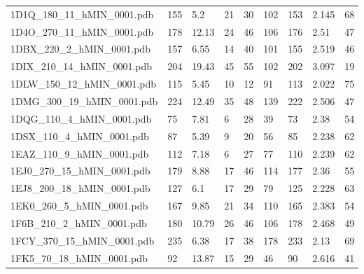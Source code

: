 \documentclass{bioinfo}
\begin{document}
\begin{table}[!t]
{\begin{tabular}{lllllllll}
    1D1Q\_180\_11\_hMIN\_0001.pdb & 155      & 5.2        & 21          & 30          & 102         & 153     & 2.145           & 68           \\
    1D4O\_270\_11\_hMIN\_0001.pdb & 178      & 12.13      & 24          & 46          & 106         & 176     & 2.51            & 47           \\
    1DBX\_220\_2\_hMIN\_0001.pdb & 157      & 6.55       & 14          & 40          & 101         & 155     & 2.519           & 46           \\
    1DIX\_210\_14\_hMIN\_0001.pdb & 204      & 19.43      & 45          & 55          & 102         & 202     & 3.097           & 19           \\
    1DLW\_150\_12\_hMIN\_0001.pdb & 115      & 5.45       & 10          & 12          & 91          & 113     & 2.022           & 75           \\
    1DMG\_300\_19\_hMIN\_0001.pdb & 224      & 12.49      & 35          & 48          & 139         & 222     & 2.506           & 47           \\
    1DQG\_110\_4\_hMIN\_0001.pdb & 75       & 7.81       & 6           & 28          & 39          & 73      & 2.38            & 54           \\
    1DSX\_110\_4\_hMIN\_0001.pdb & 87       & 5.39       & 9           & 20          & 56          & 85      & 2.238           & 62           \\
    1EAZ\_110\_9\_hMIN\_0001.pdb & 112      & 7.18       & 6           & 27          & 77          & 110     & 2.239           & 62           \\
    1EJ0\_270\_15\_hMIN\_0001.pdb & 179      & 8.88       & 17          & 46          & 114         & 177     & 2.36            & 55           \\
    1EJ8\_200\_18\_hMIN\_0001.pdb & 127      & 6.1        & 17          & 29          & 79          & 125     & 2.228           & 63           \\
    1EK0\_260\_5\_hMIN\_0001.pdb & 167      & 9.85       & 21          & 34          & 110         & 165     & 2.383           & 54           \\
    1F6B\_210\_2\_hMIN\_0001.pdb & 180      & 10.79      & 26          & 46          & 106         & 178     & 2.468           & 49           \\
    1FCY\_370\_15\_hMIN\_0001.pdb & 235      & 6.38       & 17          & 38          & 178         & 233     & 2.13            & 69           \\
    1FK5\_70\_18\_hMIN\_0001.pdb & 92       & 13.87      & 15          & 29          & 46          & 90      & 2.616           & 41           \\

\end{tabular}}
\end{table}
\end{document}
